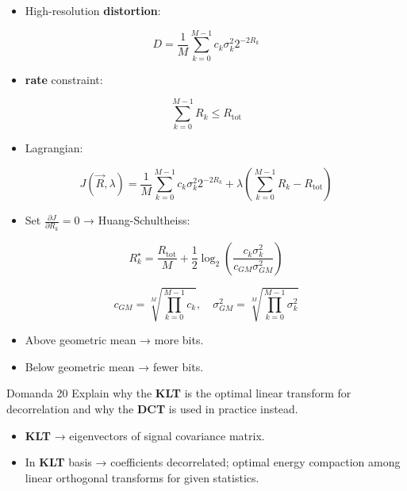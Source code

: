 \begin{itemize}
  \item High-resolution \textbf{distortion}:
\end{itemize}


$$
D = \frac{1}{M}\sum_{k=0}^{M-1} c_k\sigma_k^2 2^{-2R_k}
$$


\begin{itemize}
  \item \textbf{rate} constraint:
\end{itemize}


$$
\sum_{k=0}^{M-1} R_k \le R_{\text{tot}}
$$


\begin{itemize}
  \item Lagrangian:
\end{itemize}


$$
J(\vec{R},\lambda)=
\frac{1}{M}\sum_{k=0}^{M-1} c_k\sigma_k^2 2^{-2R_k}
+\lambda\left(\sum_{k=0}^{M-1}R_k-R_{\text{tot}}\right)
$$


\begin{itemize}
  \item Set $\frac{\partial J}{\partial R_k}=0$ → Huang-Schultheiss:
\end{itemize}


$$
R_k^\star = \frac{R_{\text{tot}}}{M}
+\frac{1}{2}\log_2\left(
\frac{c_k\sigma_k^2}{c_{GM}\sigma_{GM}^2}
\right)
$$



$$
c_{GM}=\sqrt[M]{\prod_{k=0}^{M-1} c_k},
\quad
\sigma_{GM}^2=\sqrt[M]{\prod_{k=0}^{M-1}\sigma_k^2}
$$


\begin{itemize}
  \item Above geometric mean → more bits.
  \item Below geometric mean → fewer bits.
\end{itemize}



\begin{questionbox}{Domanda 20}
Explain why the \textbf{KLT} is the optimal linear transform for decorrelation and why the \textbf{DCT} is used in practice instead.
\end{questionbox}


\begin{itemize}
  \item \textbf{\textbf{KLT}} → eigenvectors of signal covariance matrix.
  \item In \textbf{KLT} basis → coefficients decorrelated; optimal energy compaction among linear orthogonal transforms for given statistics.
\end{itemize}



